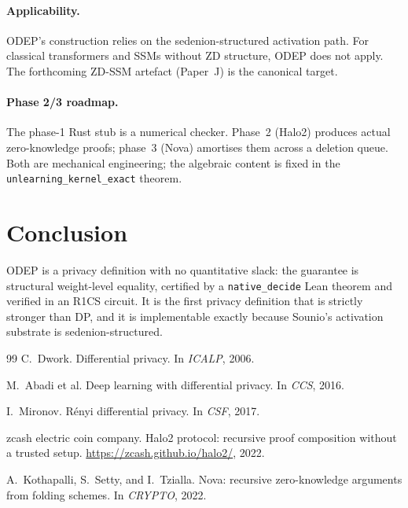 \documentclass{article}
\begin{document}
\paragraph{Applicability.}
ODEP's construction relies on the sedenion-structured activation
path.  For classical transformers and SSMs without ZD structure,
ODEP does not apply.  The forthcoming ZD-SSM artefact (Paper~J) is
the canonical target.

\paragraph{Phase 2/3 roadmap.}
The phase-1 Rust stub is a numerical checker.  Phase~2 (Halo2)
produces actual zero-knowledge proofs; phase~3 (Nova) amortises them
across a deletion queue.  Both are mechanical engineering; the
algebraic content is fixed in the \texttt{unlearning\_kernel\_exact}
theorem.

\section{Conclusion}

ODEP is a privacy definition with no quantitative slack: the
guarantee is structural weight-level equality, certified by a
\texttt{native\_decide} Lean theorem and verified in an R1CS circuit.
It is the first privacy definition that is strictly stronger than DP,
and it is implementable exactly because Sounio's activation substrate
is sedenion-structured.

\begin{thebibliography}{99}
C.~Dwork.
\newblock Differential privacy.
\newblock In \emph{ICALP}, 2006.

M.~Abadi et al.
\newblock Deep learning with differential privacy.
\newblock In \emph{CCS}, 2016.

I.~Mironov.
\newblock R\'enyi differential privacy.
\newblock In \emph{CSF}, 2017.

zcash electric coin company.
\newblock Halo2 protocol: recursive proof composition without a trusted
  setup.
\newblock \url{https://zcash.github.io/halo2/}, 2022.

A.~Kothapalli, S.~Setty, and I.~Tzialla.
\newblock Nova: recursive zero-knowledge arguments from folding schemes.
\newblock In \emph{CRYPTO}, 2022.
\end{thebibliography}
\end{document}
